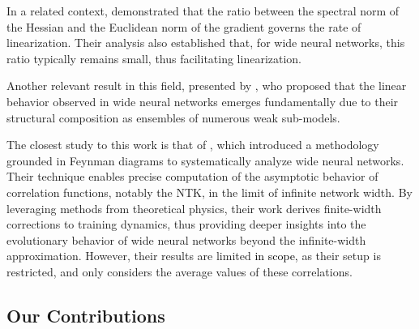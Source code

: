 \documentclass{article} %
\begin{document}
In a related context, \cite{OnTheLin2020} demonstrated that the ratio between the spectral norm of the Hessian and the Euclidean norm of the gradient governs the rate of linearization. Their analysis also established that, for wide neural networks, this ratio typically remains small, thus facilitating linearization. 

Another relevant result in this field, presented by \cite{Transition2022Liu}, who proposed that the linear behavior observed in wide neural networks emerges fundamentally due to their structural composition as ensembles of numerous weak sub-models.

The closest study to this work is that of \cite{AsymptoticsFeynmanDiagrams2019}, which introduced a methodology grounded in Feynman diagrams to systematically analyze wide neural networks. Their technique enables precise computation of the asymptotic behavior of correlation functions, notably the NTK, in the limit of infinite network width. By leveraging methods from theoretical physics, their work derives finite-width corrections to training dynamics, thus providing deeper insights into the evolutionary behavior of wide neural networks beyond the infinite-width approximation. However, their results are limited \textcolor{black}{in scope,} as their setup is restricted, and only considers the average values of these correlations.

\subsection{Our Contributions}
\label{sec:OurContributions}
\end{document}
